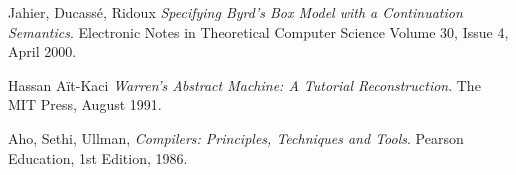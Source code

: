 \documentclass[12pt]{article}
\begin{document}
\begin{thebibliography}{9}

  Jahier, Ducass\'e, Ridoux
  \emph{Specifying Byrd's Box Model with a Continuation Semantics}.
  Electronic Notes in Theoretical Computer Science
  Volume 30, Issue 4,
  April 2000.

  Hassan A\"it-Kaci
  \emph{Warren's Abstract Machine: A Tutorial Reconstruction}.
  The MIT Press,
  August 1991.
  
  Aho, Sethi, Ullman,
  \emph{Compilers: Principles, Techniques and Tools}.
  Pearson Education,
  1st Edition,
  1986.

\end{thebibliography}
\end{document}
